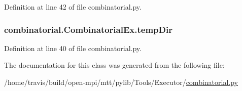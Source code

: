 Definition at line 42 of file combinatorial.\-py.

\hypertarget{classcombinatorial_1_1_combinatorial_ex_a24b3bc621a8380e406bade192bc371d4}{
\subsubsection[{temp\-Dir}]{\setlength{\rightskip}{0pt plus 5cm}combinatorial.\-Combinatorial\-Ex.\-temp\-Dir}}\label{classcombinatorial_1_1_combinatorial_ex_a24b3bc621a8380e406bade192bc371d4}


Definition at line 40 of file combinatorial.\-py.



The documentation for this class was generated from the following file\-:\begin{DoxyCompactItemize}
\item 
/home/travis/build/open-\/mpi/mtt/pylib/\-Tools/\-Executor/\hyperlink{combinatorial_8py}{combinatorial.\-py}\end{DoxyCompactItemize}
